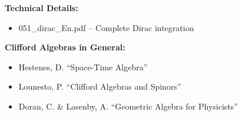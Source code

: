 	\textbf{Technical Details:}
	\begin{itemize}
		\item 051\_dirac\_En.pdf -- Complete Dirac integration

	\end{itemize}
	
	\textbf{Clifford Algebras in General:}
	\begin{itemize}
		\item Hestenes, D. ``Space-Time Algebra''
		\item Lounesto, P. ``Clifford Algebras and Spinors''
		\item Doran, C. \& Lasenby, A. ``Geometric Algebra for Physicists''
	\end{itemize}
	